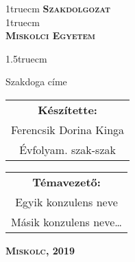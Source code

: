 \pagestyle{empty} %

{\large
\begin{center}
\vglue 1truecm
\textbf{\huge\textsc{Szakdolgozat}}\\
\vglue 1truecm
\\
\textbf{\textsc{Miskolci Egyetem}}
\end{center}}

\vglue 1.5truecm %

{\LARGE
\begin{center}
	Szakdoga címe
\end{center}}

\vspace*{2.5truecm}
{\large
\begin{center}
\begin{tabular}{c}
\textbf{Készítette:}\\
Ferencsik Dorina Kinga\\
Évfolyam. szak-szak
\end{tabular}
\end{center}
\begin{center}
\begin{tabular}{c}
\textbf{Témavezető:}\\
Egyik konzulens neve\\
Másik konzulens neve\ldots
\end{tabular}
\end{center}}
\vfill
{\large
\begin{center}
\textbf{\textsc{Miskolc, 2019}}
\end{center}}

\newpage
